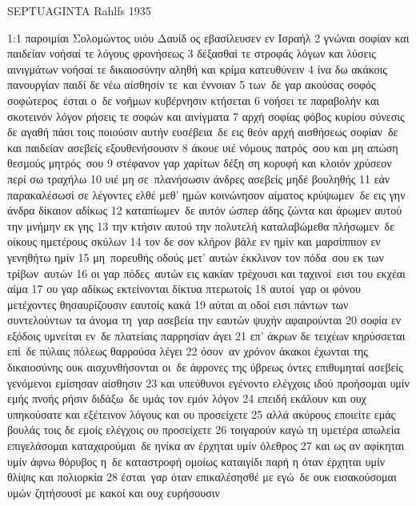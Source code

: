 \documentclass[10pt,oneside,footinclude=true,headinclude=true]{scrbook} %
\begin{document}
\large
{}


\foreignlanguage{english}{SEPTUAGINTA Rahlfs 1935}
\par
1:1 παροιμίαι Σολομώντος υιόυ Δαυίδ ος εβασίλευσεν εν Ισραήλ
2 γνώναι σοφίαν και παιδείαν νοήσαί τε λόγους φρονήσεως
3 δέξασθαί τε στροφάς λόγων και λύσεις αινιγμάτων νοήσαί τε δικαιοσύνην αληθή και κρίμα κατευθύνειν
4 ίνα δω ακάκοις πανουργίαν παιδί δε νέω αίσθησίν τε και έννοιαν
5 των δε γαρ ακούσας σοφός σοφώτερος έσται ο δε νοήμων κυβέρνησιν κτήσεται
6 νοήσει τε παραβολήν και σκοτεινόν λόγον ρήσεις τε σοφών και αινίγματα
7 αρχή σοφίας φόβος κυρίου σύνεσις δε αγαθή πάσι τοις ποιούσιν αυτήν ευσέβεια δε εις θεόν αρχή αισθήσεως σοφίαν δε και παιδείαν ασεβείς εξουθενήσουσιν
8 άκουε υιέ νόμους πατρός σου και μη απώση θεσμούς μητρός σου
9 στέφανον γαρ χαρίτων δέξη ση κορυφή και κλοιόν χρύσεον περί σω τραχήλω
10 υιέ μη σε πλανήσωσιν άνδρες ασεβείς μηδέ βουληθής
11 εάν παρακαλέσωσί σε λέγοντες ελθέ μεθ' ημών κοινώνησον αίματος κρύψωμεν δε εις γην άνδρα δίκαιον αδίκως
12 καταπίωμεν δε αυτόν ώσπερ άδης ζώντα και άρωμεν αυτού την μνήμην εκ γης
13 την κτήσιν αυτού την πολυτελή καταλαβώμεθα πλήσωμεν δε οίκους ημετέρους σκύλων
14 τον δε σον κλήρον βάλε εν ημίν και μαρσίππιον εν γενηθήτω ημίν
15 μη πορευθής οδούς μετ' αυτών έκκλινον τον πόδα σου εκ των τρίβων αυτών
16 οι γαρ πόδες αυτών εις κακίαν τρέχουσι και ταχινοί εισι του εκχέαι αίμα
17 ου γαρ αδίκως εκτείνονται δίκτυα πτερωτοίς
18 αυτοί γαρ οι φόνου μετέχοντες θησαυρίζουσιν εαυτοίς κακά
19 αύται αι οδοί εισι πάντων των συντελούντων τα άνομα τη γαρ ασεβεία την εαυτών ψυχήν αφαιρούνται
20 σοφία εν εξόδοις υμνείται εν δε πλατείαις παρρησίαν άγει
21 επ' άκρων δε τειχέων κηρύσσεται επί δε πύλαις πόλεως θαρρούσα λέγει
22 όσον αν χρόνον άκακοι έχωνται της δικαιοσύνης ουκ αισχυνθήσονται οι δε άφρονες της ύβρεως όντες επιθυμηταί ασεβείς γενόμενοι εμίσησαν αίσθησιν
23 και υπεύθυνοι εγένοντο ελέγχοις ιδού προήσομαι υμίν εμής πνοής ρήσιν διδάξω δε υμάς τον εμόν λόγον
24 επειδή εκάλουν και ουχ υπηκούσατε και εξέτεινον λόγους και ου προσείχετε
25 αλλά ακύρους εποιείτε εμάς βουλάς τοις δε εμοίς ελέγχοις ου προσείχετε
26 τοιγαρούν καγώ τη υμετέρα απωλεία επιγελάσομαι καταχαρούμαι δε ηνίκα αν έρχηται υμίν όλεθρος
27 και ως αν αφίκηται υμίν άφνω θόρυβος η δε καταστροφή ομοίως καταιγίδι παρή η όταν έρχηται υμίν θλίψις και πολιορκία
28 έσται γαρ όταν επικαλέσησθέ με εγώ δε ουκ εισακούσομαι υμών ζητήσουσί με κακοί και ουχ ευρήσουσιν
\end{document}

